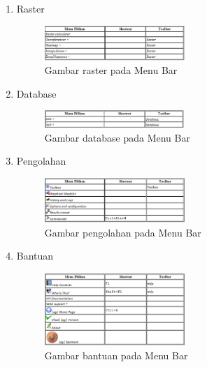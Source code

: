 \begin{enumerate}
\begin{figure}[ht]
    \label{menubar5}
    \end{figure}
\item
Raster
\begin{figure}[ht]
    \centerline{\includegraphics[width=0.5\textwidth]{figures/menubar6}}
    \caption{Gambar raster pada Menu Bar}
    \label{menubar6}
    \end{figure}
\item
Database
\begin{figure}[ht]
    \centerline{\includegraphics[width=0.5\textwidth]{figures/menubar7}}
    \caption{Gambar database pada Menu Bar}
    \label{menubar7}
    \end{figure}
\item
Pengolahan
\begin{figure}[ht]
    \centerline{\includegraphics[width=0.5\textwidth]{figures/menubar8}}
    \caption{Gambar pengolahan pada Menu Bar}
    \label{menubar8}
    \end{figure}
\item
Bantuan
\begin{figure}[ht]
    \centerline{\includegraphics[width=0.5\textwidth]{figures/menubar9}}
    \caption{Gambar bantuan pada Menu Bar}
    \label{menubar9}
    \end{figure}
\end{enumerate}


